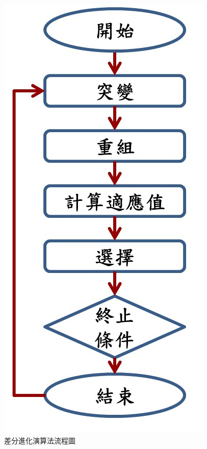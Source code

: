 \documentclass[14pt,a4paper]{report}  %
\begin{document}
        \begin{figure}[H]
        \centering
        \includegraphics[scale=0.4]{差分進化演算法.jpg} 
        \caption{差分進化演算法流程圖}
        \label{fig:scale}
    \end{figure}
    \newpage
\end{document}
